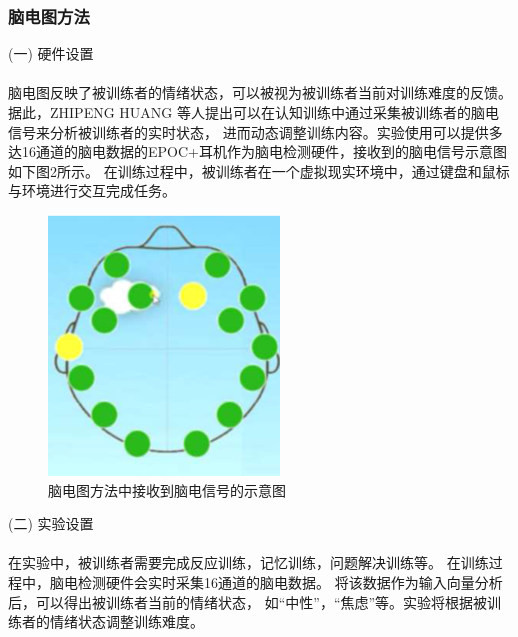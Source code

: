 \documentclass[12pt]{article}
\begin{document}
            \subsubsection{脑电图方法}
            (一) 硬件设置\paragraph{}
            脑电图反映了被训练者的情绪状态，可以被视为被训练者当前对训练难度的反馈。
            据此，ZHIPENG HUANG \cite{ref9}等人提出可以在认知训练中通过采集被训练者的脑电信号来分析被训练者的实时状态，
            进而动态调整训练内容。实验使用可以提供多达16通道的脑电数据的EPOC+耳机作为脑电检测硬件，接收到的脑电信号示意图如下图2所示。
            在训练过程中，被训练者在一个虚拟现实环境中，通过键盘和鼠标与环境进行交互完成任务。
            \begin{figure}[H]
            	\centering
            	\includegraphics[scale=0.8]{images/brain_distribute.png}
            	\caption{脑电图方法中接收到脑电信号的示意图}
            	\label{fig:label}
            \end{figure}
            (二) 实验设置\paragraph{}
            在实验中，被训练者需要完成反应训练，记忆训练，问题解决训练等。
            在训练过程中，脑电检测硬件会实时采集16通道的脑电数据。
            将该数据作为输入向量分析后，可以得出被训练者当前的情绪状态，
            如“中性”，“焦虑”等。实验将根据被训练者的情绪状态调整训练难度。
\end{document}
